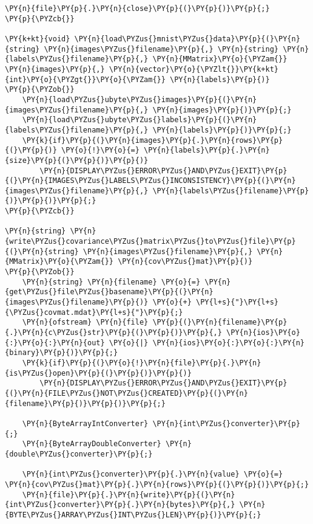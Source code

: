 \begin{Verbatim}[commandchars=\\\{\}]
	\PY{n}{file}\PY{p}{.}\PY{n}{close}\PY{p}{(}\PY{p}{)}\PY{p}{;}
\PY{p}{\PYZcb{}}

\PY{k+kt}{void} \PY{n}{load\PYZus{}mnist\PYZus{}data}\PY{p}{(}\PY{n}{string} \PY{n}{images\PYZus{}filename}\PY{p}{,} \PY{n}{string} \PY{n}{labels\PYZus{}filename}\PY{p}{,} \PY{n}{MMatrix}\PY{o}{\PYZam{}} \PY{n}{images}\PY{p}{,} \PY{n}{vector}\PY{o}{\PYZlt{}}\PY{k+kt}{int}\PY{o}{\PYZgt{}}\PY{o}{\PYZam{}} \PY{n}{labels}\PY{p}{)}
\PY{p}{\PYZob{}}
    \PY{n}{load\PYZus{}ubyte\PYZus{}images}\PY{p}{(}\PY{n}{images\PYZus{}filename}\PY{p}{,} \PY{n}{images}\PY{p}{)}\PY{p}{;}
    \PY{n}{load\PYZus{}ubyte\PYZus{}labels}\PY{p}{(}\PY{n}{labels\PYZus{}filename}\PY{p}{,} \PY{n}{labels}\PY{p}{)}\PY{p}{;}
    \PY{k}{if}\PY{p}{(}\PY{n}{images}\PY{p}{.}\PY{n}{rows}\PY{p}{(}\PY{p}{)} \PY{o}{!}\PY{o}{=} \PY{n}{labels}\PY{p}{.}\PY{n}{size}\PY{p}{(}\PY{p}{)}\PY{p}{)}
        \PY{n}{DISPLAY\PYZus{}ERROR\PYZus{}AND\PYZus{}EXIT}\PY{p}{(}\PY{n}{IMAGES\PYZus{}LABELS\PYZus{}INCONSISTENCY}\PY{p}{(}\PY{n}{images\PYZus{}filename}\PY{p}{,} \PY{n}{labels\PYZus{}filename}\PY{p}{)}\PY{p}{)}\PY{p}{;}
\PY{p}{\PYZcb{}}

\PY{n}{string} \PY{n}{write\PYZus{}covariance\PYZus{}matrix\PYZus{}to\PYZus{}file}\PY{p}{(}\PY{n}{string} \PY{n}{images\PYZus{}filename}\PY{p}{,} \PY{n}{MMatrix}\PY{o}{\PYZam{}} \PY{n}{cov\PYZus{}mat}\PY{p}{)}
\PY{p}{\PYZob{}}
	\PY{n}{string} \PY{n}{filename} \PY{o}{=} \PY{n}{get\PYZus{}file\PYZus{}basename}\PY{p}{(}\PY{n}{images\PYZus{}filename}\PY{p}{)} \PY{o}{+} \PY{l+s}{"}\PY{l+s}{\PYZus{}covmat.mdat}\PY{l+s}{"}\PY{p}{;}
	\PY{n}{ofstream} \PY{n}{file} \PY{p}{(}\PY{n}{filename}\PY{p}{.}\PY{n}{c\PYZus{}str}\PY{p}{(}\PY{p}{)}\PY{p}{,} \PY{n}{ios}\PY{o}{:}\PY{o}{:}\PY{n}{out} \PY{o}{|} \PY{n}{ios}\PY{o}{:}\PY{o}{:}\PY{n}{binary}\PY{p}{)}\PY{p}{;}
	\PY{k}{if}\PY{p}{(}\PY{o}{!}\PY{n}{file}\PY{p}{.}\PY{n}{is\PYZus{}open}\PY{p}{(}\PY{p}{)}\PY{p}{)}
		\PY{n}{DISPLAY\PYZus{}ERROR\PYZus{}AND\PYZus{}EXIT}\PY{p}{(}\PY{n}{FILE\PYZus{}NOT\PYZus{}CREATED}\PY{p}{(}\PY{n}{filename}\PY{p}{)}\PY{p}{)}\PY{p}{;}

	\PY{n}{ByteArrayIntConverter} \PY{n}{int\PYZus{}converter}\PY{p}{;}
	\PY{n}{ByteArrayDoubleConverter} \PY{n}{double\PYZus{}converter}\PY{p}{;}

    \PY{n}{int\PYZus{}converter}\PY{p}{.}\PY{n}{value} \PY{o}{=} \PY{n}{cov\PYZus{}mat}\PY{p}{.}\PY{n}{rows}\PY{p}{(}\PY{p}{)}\PY{p}{;}
    \PY{n}{file}\PY{p}{.}\PY{n}{write}\PY{p}{(}\PY{n}{int\PYZus{}converter}\PY{p}{.}\PY{n}{bytes}\PY{p}{,} \PY{n}{BYTE\PYZus{}ARRAY\PYZus{}INT\PYZus{}LEN}\PY{p}{)}\PY{p}{;}


\end{Verbatim}

